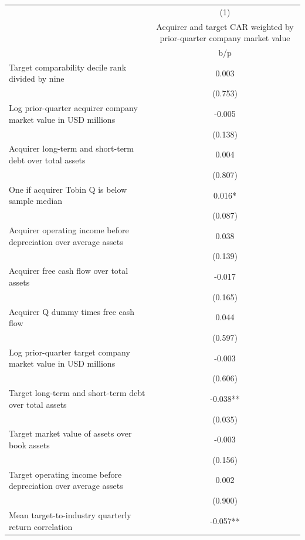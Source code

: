 {
\def\sym#1{\ifmmode^{#1}\else\(^{#1}\)\fi}
\begin{tabular}{l*{1}{c}}
\hline\hline
                    &\multicolumn{1}{c}{(1)}\\
                    &\multicolumn{1}{c}{Acquirer and target CAR weighted by prior-quarter company market value}\\
                    &         b/p   \\
\hline
Target comparability decile rank divided by nine&       0.003   \\
                    &     (0.753)   \\
Log prior-quarter acquirer company market value in USD millions&      -0.005   \\
                    &     (0.138)   \\
Acquirer long-term and short-term debt over total assets&       0.004   \\
                    &     (0.807)   \\
One if acquirer Tobin Q is below sample median&       0.016*  \\
                    &     (0.087)   \\
Acquirer operating income before depreciation over average assets&       0.038   \\
                    &     (0.139)   \\
Acquirer free cash flow over total assets&      -0.017   \\
                    &     (0.165)   \\
Acquirer Q dummy times free cash flow&       0.044   \\
                    &     (0.597)   \\
Log prior-quarter target company market value in USD millions&      -0.003   \\
                    &     (0.606)   \\
Target long-term and short-term debt over total assets&      -0.038** \\
                    &     (0.035)   \\
Target market value of assets over book assets&      -0.003   \\
                    &     (0.156)   \\
Target operating income before depreciation over average assets&       0.002   \\
                    &     (0.900)   \\
Mean target-to-industry quarterly return correlation&      -0.057** \\

\end{tabular}}
